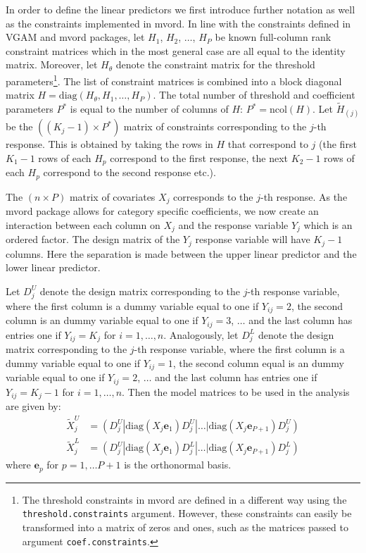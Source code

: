 \documentclass[a4paper,fleqn]{article}
\newcommand{\pkg}[1]{{\fontseries{b}\selectfont #1}}
\begin{document}
In order to define the linear predictors we  first introduce further notation as well as  the constraints implemented in \pkg{mvord}. In line with the constraints defined in \pkg{VGAM} and \pkg{mvord} packages, let $H_1$, $H_2$, $\ldots$, $H_P$ be known full-column rank constraint matrices which in the most general case are all equal to the identity matrix. Moreover, let $H_\theta$ denote the constraint matrix for the threshold parameters\footnote{The threshold constraints in \pkg{mvord} are defined in a different way using the \texttt{threshold.constraints} argument. However, these constraints can easily be transformed into a matrix of zeros and ones, such as the matrices passed to argument \texttt{coef.constraints}.}.
The list of constraint matrices is combined into a block diagonal matrix $H = \mathrm{diag}(H_\theta, H_1,\ldots,H_P)$.
The total number of threshold and coefficient parameters $P^*$ is equal to the number of columns of $H$: $P^*=\mathrm{ncol}(H)$. Let $\tilde H_{(j)}$ be the $((K_j-1)\times P^*)$ matrix of constraints corresponding to the $j$-th response. This is obtained by taking the rows in $H$ that correspond to $j$ (the first $K_1-1$ rows of each $H_p$ correspond to the first response, the next $K_2-1$ rows of each $H_p$ correspond to the second response etc.).

The $(n\times P)$ matrix of covariates $X_j$ corresponds to the $j$-th response.
As the \pkg{mvord} package allows for category specific coefficients, we now create an interaction between each column on $X_j$ and the response variable $Y_j$ which is an ordered factor. The design matrix of the $Y_j$ response variable will have $K_j-1$ columns. Here the separation is made between the upper linear predictor and the lower linear predictor.

Let $D_j^U$ denote the design matrix corresponding to the  $j$-th response variable,
where the first column is a dummy variable equal to one if $Y_{ij}=2$, the second column is an dummy variable equal to one if $Y_{ij}=3$, $\ldots$ and the last column has entries one if $Y_{ij}=K_j$ for $i=1,\ldots,n$. Analogously, let $D_j^L$ denote the design matrix corresponding to the  $j$-th response variable,
where the first column is a dummy variable equal to one if $Y_{ij}=1$, the second column equal is an dummy variable equal to one if $Y_{ij}=2$, $\ldots$ and the last column has entries one if $Y_{ij}=K_j-1$ for $i=1,\ldots,n$.
Then the model matrices to be used in the analysis are given by:
\begin{align*}
\tilde X_j^U&= \left(D_j^U| \mathrm{diag}(X_j\bm e_1)D_j^U|\ldots|\mathrm{diag}(X_j\bm e_{P+1})D_j^U \right)\\
\tilde X_j^L&=\left(D_j^U|\mathrm{diag}(X_j\bm e_1)D_j^L|\ldots|\mathrm{diag}(X_j\bm e_{P+1})D_j^L \right)
\end{align*}
where $\bm e_p$ for $p=1,\ldots P+1$ is the orthonormal basis.
\end{document}
